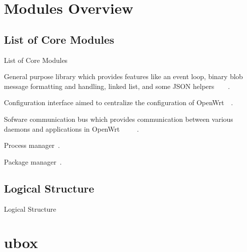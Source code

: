 \section{Modules Overview}

\subsection{List of Core Modules}
\begin{frame}{List of Core Modules}
    \pause
    \begin{description}[<+-|alert@+>]
        \item[ubox] General purpose library which provides features like an event loop, binary blob message formatting and handling, linked list, and some JSON helpers~\cite{openwrt-ubox}~\cite{openwrt-libubox}~\cite{lutfi-ubox_ubus}~\cite{openwrt-log}.
        \item[uci] Configuration interface aimed to centralize the configuration of OpenWrt~\cite{openwrt-uci}~\cite{openwrt-libuci}.
        \item[ubus] Sofware communication bus which provides communication between various daemons and applications in OpenWrt~\cite{openwrt-ubus}~\cite{lutfi-ubus}~\cite{lutfi-ubox_ubus}~\cite{openwrt-rpc_guide}~\cite{openwrt-rpc_techref}.
        \item[procd] Process manager~\cite{openwrt-procd}.
        \item[opkg] Package manager~\cite{openwrt-opkg}.
    \end{description}
\end{frame}

\subsection{Logical Structure}
\begin{frame}{Logical Structure}
\end{frame}

\section{ubox}

